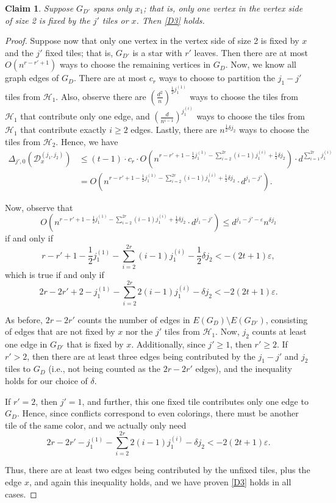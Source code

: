 \documentclass{article}
\newtheorem{claim}[theorem]{Claim}
\theoremstyle{definition}
\newcommand\cH{{\mathcal H}}
\newcommand{\cD}{\mathcal{D}}
\begin{document}
\begin{claim}
    Suppose $G_{D'}$ spans only $x_1$; that is, only one vertex in the vertex side of size 2 is fixed by the $j'$ tiles or $x$. Then \ref{D3} holds.
\end{claim}

\begin{proof}
    Suppose now that only one vertex in the vertex side of size 2 is fixed by $x$ and the $j'$ fixed tiles; that is, $G_{D'}$ is a star with $r'$ leaves. Then there are at most $O(n^{r-r' +1})$ ways to choose the remaining vertices in $G_D$.  Now, we know all graph edges of $G_D$.  There are at most $c_r$ ways to choose to partition the $j_1 - j'$ tiles from $\cH_1$.  Also, observe there are $\left( \frac{d^2}{n} \right)^{\frac{1}{2} j_1^{(1)}}$ ways to choose the tiles from $\cH_1$ that contribute only one edge, and $\left( \frac{d}{n^{i-1}} \right)^{j_1^{(i)}}$ ways to choose the tiles from $\cH_1$ that contribute exactly $i \geq 2$ edges.  Lastly, there are $n^{\frac{1}{2} \delta j_2}$ ways to choose the tiles from $\cH_2$.  Hence, we have 
\begin{align*}
    \Delta_{j',0} \left( \cD_x^{(j_1,j_2)} \right) 
    &\leq (t-1) \cdot c_r \cdot  O \left( n^{r - r' + 1 - \frac{1}{2} j_1^{(1)} - \sum_{i=2}^{2r} (i-1) j_1^{(i)} + \frac{1}{2} \delta j_2} \right) \cdot d^{\sum_{i=1}^{2r} j_1^{(i)}} \\
    &= O \left( n^{r - r' + 1 - \frac{1}{2} j_1^{(1)} - \sum_{i=2}^{2r} (i-1) j_1^{(i)} + \frac{1}{2} \delta j_2} \cdot d^{j_1 - j'} \right).
\end{align*}


Now, observe that 
$$
    O \left( n^{r - r' + 1 - \frac{1}{2} j_1^{(1)} - \sum_{i=2}^{2r} (i-1) j_1^{(i)} + \frac{1}{2} \delta j_2} \cdot d^{j_1 - j'} \right) \leq d^{j_1 - j' - \varepsilon} n^{\delta j_2}
$$
if and only if 
$$
    r - r' + 1 - \frac{1}{2} j_1^{(1)} - \sum_{i=2}^{2r} (i-1) j_1^{(i)} - \frac{1}{2} \delta j_2 < -(2t+1) \varepsilon,
$$
which is true if and only if 
$$
    2r - 2r' + 2 - j_1^{(1)} - \sum_{i=2}^{2r} 2 (i-1) j_1^{(i)} - \delta j_2 < - 2(2t+1) \varepsilon. 
$$

As before, $2r - 2r'$ counts the number of edges in $E(G_D)\setminus E(G_{D'})$, consisting of edges that are not fixed by $x$ nor the $j'$ tiles from $\cH_1$.  Now, $j_2$ counts at least one edge in $G_{D'}$ that is fixed by $x$.  Additionally, since $j' \geq 1$, then $r' \geq 2$.  If $r' > 2$, then there are at least three edges being contributed by the $j_1 - j'$ and $j_2$ tiles to $G_D$ (i.e., not being counted as the $2r - 2r'$ edges), and the inequality holds for our choice of $\delta$.  


If $r' = 2$, then $j' = 1$, and further, this one fixed tile contributes only one edge to $G_D$.  Hence, since conflicts correspond to even colorings, there must be another tile of the same color, and we actually only need 
$$
    2r - 2r' - j_1^{(1)} - \sum_{i=2}^{2r} 2 (i-1) j_1^{(i)} - \delta j_2 < - 2(2t+1) \varepsilon. 
$$

Thus, there are at least two edges being contributed by the unfixed tiles, plus the edge $x$, and again this inequality holds, and we have proven \ref{D3} holds in all cases.  
\end{proof}
 
\end{document}
